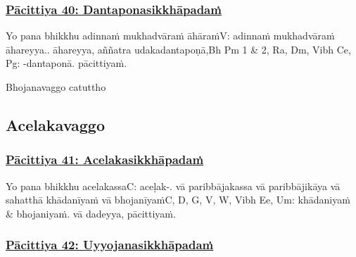 \subsubsection*{\hyperref[exp40]{Pācittiya 40: Dantaponasikkhāpadaṁ}}
\label{pac40}

Yo pana bhikkhu adinnaṁ mukhadvāraṁ āhāraṁ\makeatletter\hyperlink{endnote-appendix}\makeatother V: adinnaṁ mukhadvāraṁ āhareyya.. āhareyya, aññatra udakadantapoṇā,\makeatletter\hyperlink{endnote-appendix}\makeatother Bh Pm 1 & 2, Ra, Dm, Vibh Ce, Pg: -dantaponā. pācittiyaṁ.

\begin{center}
	Bhojanavaggo catuttho
\end{center}



\subsection{Acelakavaggo}

\subsubsection*{\hyperref[exp41]{Pācittiya 41: Acelakasikkhāpadaṁ}}
\label{pac41}

Yo pana bhikkhu acelakassa\makeatletter\hyperlink{endnote-appendix}\makeatother C: aceḷak-. vā paribbājakassa vā paribbājikāya vā sahatthā khādanīyaṁ vā bhojanīyaṁ\makeatletter\hyperlink{endnote-appendix}\makeatother C, D, G, V, W, Vibh Ee, Um: khādaniyaṁ & bhojaniyaṁ. vā dadeyya, pācittiyaṁ.



\subsubsection*{\hyperref[exp42]{Pācittiya 42: Uyyojanasikkhāpadaṁ}}
\label{pac42}

